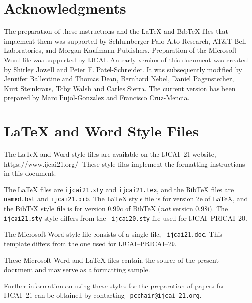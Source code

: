 \documentclass{article}
\begin{document}
\section*{Acknowledgments}

The preparation of these instructions and the \LaTeX{} and Bib\TeX{}
files that implement them was supported by Schlumberger Palo Alto
Research, AT\&T Bell Laboratories, and Morgan Kaufmann Publishers.
Preparation of the Microsoft Word file was supported by IJCAI.  An
early version of this document was created by Shirley Jowell and Peter
F. Patel-Schneider.  It was subsequently modified by Jennifer
Ballentine and Thomas Dean, Bernhard Nebel, Daniel Pagenstecher,
Kurt Steinkraus, Toby Walsh and Carles Sierra. The current version
has been prepared by Marc Pujol-Gonzalez and Francisco Cruz-Mencia.

\appendix

\section{\LaTeX{} and Word Style Files}\label{stylefiles}

The \LaTeX{} and Word style files are available on the IJCAI--21
website, \url{https://www.ijcai21.org/}.
These style files implement the formatting instructions in this
document.

The \LaTeX{} files are {\tt ijcai21.sty} and {\tt ijcai21.tex}, and
the Bib\TeX{} files are {\tt named.bst} and {\tt ijcai21.bib}. The
\LaTeX{} style file is for version 2e of \LaTeX{}, and the Bib\TeX{}
style file is for version 0.99c of Bib\TeX{} ({\em not} version
0.98i). The {\tt ijcai21.sty} style differs from the {\tt
ijcai20.sty} file used for IJCAI--PRICAI--20.

The Microsoft Word style file consists of a single file, {\tt
ijcai21.doc}. This template differs from the one used for
IJCAI--PRICAI--20.

These Microsoft Word and \LaTeX{} files contain the source of the
present document and may serve as a formatting sample.

Further information on using these styles for the preparation of
papers for IJCAI--21 can be obtained by contacting {\tt
pcchair@ijcai-21.org}.



\end{document}
